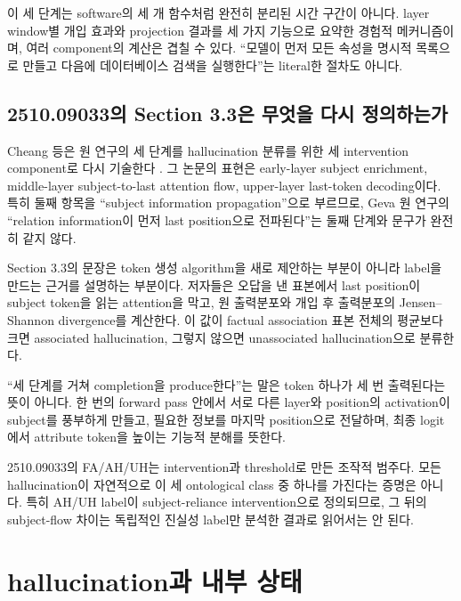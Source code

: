 이 세 단계는 software의 세 개 함수처럼 완전히 분리된 시간 구간이 아니다.
layer window별 개입 효과와 projection 결과를 세 가지 기능으로 요약한 경험적 메커니즘이며, 여러 component의 계산은 겹칠 수 있다.
``모델이 먼저 모든 속성을 명시적 목록으로 만들고 다음에 데이터베이스 검색을 실행한다''는 literal한 절차도 아니다.

\subsection{2510.09033의 Section 3.3은 무엇을 다시 정의하는가}

Cheang 등은 원 연구의 세 단계를 hallucination 분류를 위한 세 intervention component로 다시 기술한다 \citep{cheang2026knowledge}.
그 논문의 표현은 early-layer subject enrichment, middle-layer subject-to-last attention flow, upper-layer last-token decoding이다.
특히 둘째 항목을 ``subject information propagation''으로 부르므로, Geva 원 연구의 ``relation information이 먼저 last position으로 전파된다''는 둘째 단계와 문구가 완전히 같지 않다.

Section 3.3의 문장은 token 생성 algorithm을 새로 제안하는 부분이 아니라 label을 만드는 근거를 설명하는 부분이다.
저자들은 오답을 낸 표본에서 last position이 subject token을 읽는 attention을 막고, 원 출력분포와 개입 후 출력분포의 Jensen--Shannon divergence를 계산한다.
이 값이 factual association 표본 전체의 평균보다 크면 associated hallucination, 그렇지 않으면 unassociated hallucination으로 분류한다.

\begin{factbox}
``세 단계를 거쳐 completion을 produce한다''는 말은 token 하나가 세 번 출력된다는 뜻이 아니다.
한 번의 forward pass 안에서 서로 다른 layer와 position의 activation이 subject를 풍부하게 만들고, 필요한 정보를 마지막 position으로 전달하며, 최종 logit에서 attribute token을 높이는 기능적 분해를 뜻한다.
\end{factbox}

\begin{limitbox}
2510.09033의 FA/AH/UH는 intervention과 threshold로 만든 조작적 범주다.
모든 hallucination이 자연적으로 이 세 ontological class 중 하나를 가진다는 증명은 아니다.
특히 AH/UH label이 subject-reliance intervention으로 정의되므로, 그 뒤의 subject-flow 차이는 독립적인 진실성 label만 분석한 결과로 읽어서는 안 된다.
\end{limitbox}

\section{hallucination과 내부 상태}


